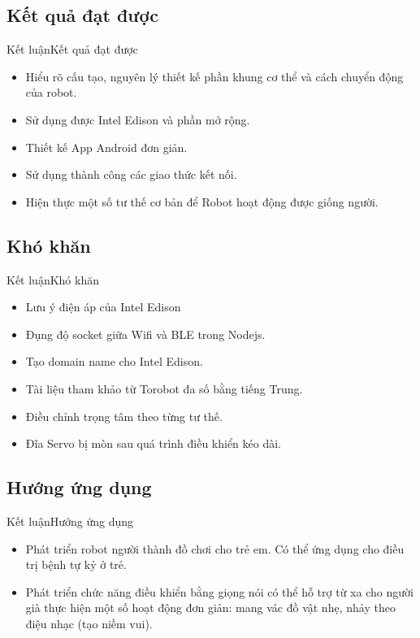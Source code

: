 \documentclass[compress, blue, 13pt,hyperref={pdfpagemode=FullScreen}]{beamer}
\begin{document}
\subsection{Kết quả đạt được}
\begin{frame}{Kết luận}{Kết quả đạt được}
\begin{itemize}
\item Hiểu rõ cấu tạo, nguyên lý thiết kế phần khung cơ thể và cách chuyển động của robot.
\item Sử dụng được Intel Edison và phần mở rộng.
\item Thiết kế App Android đơn giản.
\item Sử dụng thành công các giao thức kết nối.
\item Hiện thực một số tư thế cơ bản để Robot hoạt động được giống người.
\end{itemize}
\end{frame}
\subsection{Khó khăn}
\begin{frame}{Kết luận}{Khó khăn}
\begin{itemize}
\item Lưu ý điện áp của Intel Edison
\item Đụng độ socket giữa Wifi và BLE trong Nodejs.
\item Tạo domain name cho Intel Edison.
\item Tài liệu tham khảo từ Torobot đa số bằng tiếng Trung.
\item Điều chỉnh trọng tâm theo từng tư thế.
\item Đĩa Servo bị mòn sau quá trình điều khiển kéo dài.
\end{itemize}
\end{frame}

\subsection{Hướng ứng dụng}
\begin{frame}{Kết luận}{Hướng ứng dụng}
\begin{itemize}
\item Phát triển robot người thành đồ chơi cho trẻ em. Có thể ứng dụng cho điều trị bệnh tự kỷ ở trẻ.
\item Phát triển chức năng điều khiển bằng giọng nói có thể hỗ trợ từ xa cho người già thực hiện một số hoạt động đơn giản: mang vác đồ vật nhẹ, nhảy theo điệu nhạc (tạo niềm vui).
\end{itemize}
\end{frame}
\end{document}
